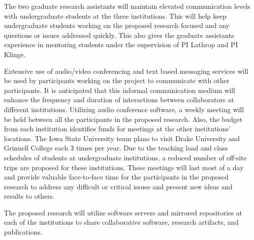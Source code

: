 \documentclass[11pt]{article}
\begin{document}
      The two graduate research assistants will maintain elevated communication levels with undergraduate students at the three institutions.
      This will help keep undergraduate students working on the proposed research focused and any questions or issues addressed quickly.
      This also gives the graduate assistants experience in mentoring students under the supervision of PI Lathrop and PI Klinge.
      
       
      Extensive use of audio/video conferencing and text based messaging services will be used by participants working on the project to communicate with other participants.
      It is anticipated that this informal communication medium will enhance the frequency and duration of interactions between collaborators at different institutions.
      Utilizing audio conference software, a weekly meeting will be held between all the participants in the proposed research.
      Also, the budget from each institution identifies funds for meetings at the other institutions' locations.
      The Iowa State University team plans to visit Drake University and Grinnell College each 3 times per year.
      Due to the teaching load and class schedules of students at undergraduate institutions, a reduced number of off-site trips are proposed for these institutions.
      These meetings will last most of a day and provide valuable face-to-face time for the participants in the proposed research to address any difficult or critical issues and present new ideas and results to others.
    
      The proposed research will utilize software servers and mirrored repositories at each of the institutions to share collaborative software, research artifacts, and publications.
    
\end{document}
